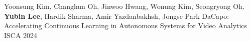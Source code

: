 \begin{cventries}

  \cventry
    {Yoonsung Kim, Changhun Oh, Jinwoo Hwang, Wonung Kim, Seongryong Oh, \textbf{Yubin Lee}, Hardik Sharma, Amir Yazdanbakhsh, Jongse Park}
    {DaCapo: Accelerating Continuous Learning in Autonomous Systems for Video Analytics}
    {ISCA 2024}
    { }
    { }


\end{cventries}
